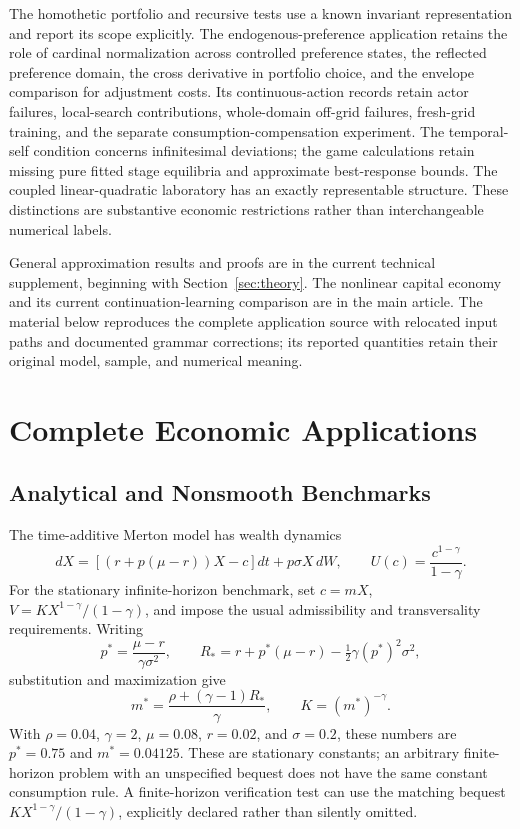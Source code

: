 \documentclass[ecta,nameyear,draft]{econsocart}
\theoremstyle{definition}
\theoremstyle{remark}
\begin{document}
The homothetic portfolio and recursive tests use a known invariant representation and report its scope explicitly. The endogenous-preference application retains the role of cardinal normalization across controlled preference states, the reflected preference domain, the cross derivative in portfolio choice, and the envelope comparison for adjustment costs. Its continuous-action records retain actor failures, local-search contributions, whole-domain off-grid failures, fresh-grid training, and the separate consumption-compensation experiment. The temporal-self condition concerns infinitesimal deviations; the game calculations retain missing pure fitted stage equilibria and approximate best-response bounds. The coupled linear-quadratic laboratory has an exactly representable structure. These distinctions are substantive economic restrictions rather than interchangeable numerical labels.

General approximation results and proofs are in the current technical supplement, beginning with Section~\ref{sec:theory}. The nonlinear capital economy and its current continuation-learning comparison are in the main article. The material below reproduces the complete application source with relocated input paths and documented grammar corrections; its reported quantities retain their original model, sample, and numerical meaning.

\section{Complete Economic Applications}\label{app:r15applications}
\subsection{Analytical and Nonsmooth Benchmarks}\label{sec:benchmarks}
The time-additive Merton model has wealth dynamics
\[
 dX=[(r+p(\mu-r))X-c]dt+p\sigma X\,dW,
 \qquad U(c)=\frac{c^{1-\gamma}}{1-\gamma}.
\]
For the stationary infinite-horizon benchmark, set $c=mX$, $V=KX^{1-\gamma}/(1-\gamma)$, and impose the usual admissibility and transversality requirements. Writing
\[
 p^*=\frac{\mu-r}{\gamma\sigma^2},\qquad
 R_*=r+p^*(\mu-r)-\tfrac12\gamma(p^*)^2\sigma^2,
\]
substitution and maximization give
\begin{equation}\label{eq:merton}
 m^*=\frac{\rho+(\gamma-1)R_*}{\gamma},\qquad K=(m^*)^{-\gamma}.
\end{equation}
With $\rho=0.04$, $\gamma=2$, $\mu=0.08$, $r=0.02$, and $\sigma=0.2$, these numbers are $p^*=0.75$ and $m^*=0.04125$. These are stationary constants; an arbitrary finite-horizon problem with an unspecified bequest does not have the same constant consumption rule. A finite-horizon verification test can use the matching bequest $KX^{1-\gamma}/(1-\gamma)$, explicitly declared rather than silently omitted.
\end{document}
